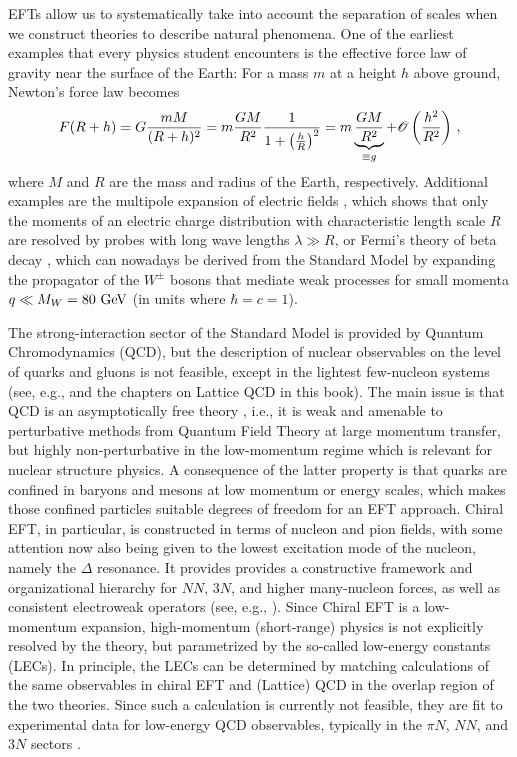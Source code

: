 {EFTs allow us to systematically take into account the separation of
scales when we construct theories to describe natural phenomena. One
of the earliest examples that every physics student encounters is the 
effective force law of gravity near the surface of the Earth: For a
mass $m$ at a height $h$ above ground, Newton's force law becomes
\begin{equation}
  F(R+h) = G\frac{m M}{(R+h)^2} = m \frac{GM}{R^2} \frac{1}{1+\left(\frac{h}{R}\right)^2}
  =m \underbrace{\frac{GM}{R^2}}_{\equiv g} + \mathcal{O}\left(\frac{h^2}{R^2}\right)\,,
\end{equation}
where $M$ and $R$ are the mass and radius of the Earth, respectively.
Additional examples are the multipole expansion of electric fields 
\cite{Jackson:1999yg}, which shows that only the moments of an electric
charge distribution with characteristic length scale $R$ are resolved
by probes with long wave lengths $\lambda\gg R$, or Fermi's theory of 
beta decay \cite{Fermi:1934eu}, which can nowadays be derived from the
Standard Model by expanding the propagator of the $W^\pm$ bosons that
mediate weak processes for small momenta $q\ll M_W=80\,\,\text{GeV}$ (in units
where $\hbar=c=1$).

The strong-interaction sector of the Standard Model is provided by
Quantum Chromodynamics (QCD), but the description of nuclear observables
on the level of quarks and gluons is not feasible, except in the lightest
few-nucleon systems (see, e.g., \cite{Detmold:2015xw} and the chapters on
Lattice QCD in this book). The main issue is that QCD is an asymptotically
free theory \cite{Gross:1973pd,Politzer:1973lq}, i.e., it is weak and amenable 
to perturbative methods from Quantum Field Theory at large momentum transfer, 
but highly non-perturbative in the low-momentum regime which is relevant for 
nuclear structure physics. A consequence of the latter property is that 
quarks are confined in baryons and mesons at low momentum or energy scales,
which makes those confined particles suitable degrees of freedom for an
EFT approach. Chiral EFT, in particular, is constructed in terms of 
nucleon and pion fields, with some attention now also being given to the
lowest excitation mode of the nucleon, namely the $\Delta$ resonance.
It provides provides a constructive framework and organizational hierarchy
for $NN$, $3N$, and higher many-nucleon forces, as well as consistent
electroweak operators (see, e.g., \cite{Epelbaum:2009ve,Machleidt:2011bh,Epelbaum:2015gf,Entem:2015qf,Gezerlis:2014zr,Lynn:2016ec,Pastore:2009zr,Pastore:2011dq,Piarulli:2013vn,Kolling:2009yq,Kolling:2011bh}).
Since Chiral EFT is a low-momentum expansion, high-momentum (short-range)
physics is not explicitly resolved by the theory, but parametrized
by the so-called low-energy constants (LECs). 
In principle, the LECs can be determined by matching calculations of
the same observables in chiral EFT and (Lattice) QCD in the overlap
region of the two theories. Since such a calculation is currently not 
feasible, they are fit to experimental data for low-energy QCD observables, 
typically in the $\pi{}N$, $NN$, and $3N$ sectors \cite{Epelbaum:2009ve,Machleidt:2011bh,Ekstrom:2015fk,Shirokov:2016wo}.

}
